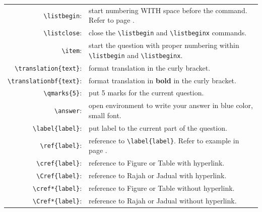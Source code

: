 \documentclass[12pt]{article}
\begin{document}
\begin{table}[H]
\begin{tabularx}{\linewidth}{r X}
		\verb|\listbegin|: & start numbering WITH space before the command. Refer to page \pageref{itm:net}. \\
		
		\verb|\listclose|: & close the \verb|\listbegin| and \verb|\listbeginx| commands.\\
		
		\verb|\item|: & start the question with proper numbering within \verb|\listbegin| and \verb|\listbeginx|.\\ 
		
		\verb|\translation{text}|: & format translation in the curly bracket.\\
		
		\verb|\translationbf{text}|: & format translation in \textbf{bold} in the curly bracket.\\
		
		\verb|\qmarks{5}|: & put 5 marks for the current question.\\
		
		\verb|\answer|: & open environment to write your answer in blue color, small font.\\
		
		\verb|\label{label}|: & put label to the current part of the question. \\
		
		\verb|\ref{label}|: & reference to \verb|\label{label}|. Refer to example in page \pageref{chemical}.\\
		
		\verb|\cref{label}|: & reference to Figure or Table  with hyperlink.\\
		
		\verb|\Cref{label}|: & reference to Rajah or Jadual  with hyperlink.\\		 
		
		\verb|\cref*{label}|: & reference to Figure or Table without hyperlink.\\
		
		\verb|\Cref*{label}|: & reference to Rajah or Jadual  without hyperlink.\\		 
	\end{tabularx}
\end{table}
\end{document}
